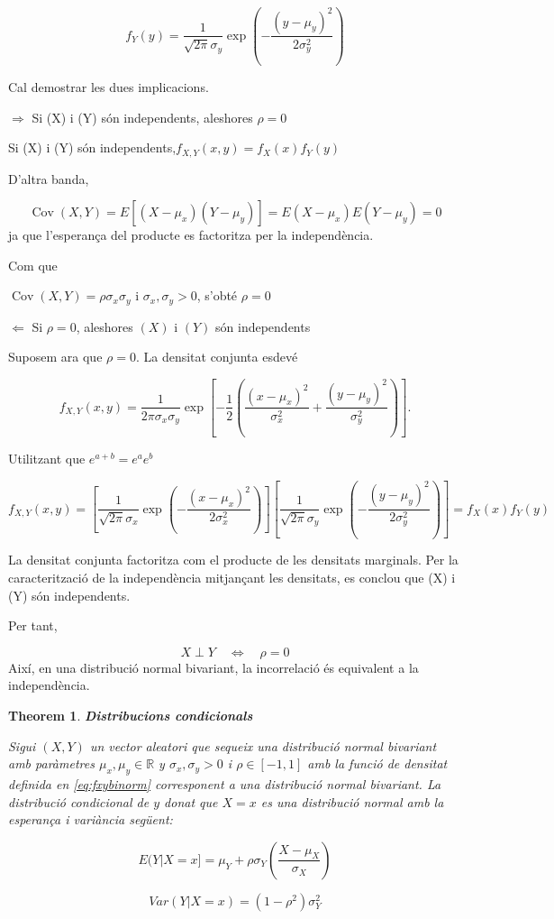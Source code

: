 \documentclass[
  catalan,
]{article}
\newtheorem{theorem}{Theorem}[section]
\theoremstyle{definition}
\theoremstyle{definition}
\theoremstyle{definition}
\theoremstyle{definition}
\theoremstyle{remark}
\begin{document}
\[
f_Y(y)=\frac{1}{\sqrt{2\pi}\sigma_y}\exp\left(-\frac{(y-\mu_y)^2}{2\sigma_y^2}\right)
\]

Cal demostrar les dues implicacions.

\(\Rightarrow\) Si (X) i (Y) són independents, aleshores \(\rho=0\)

Si (X) i (Y) són independents,\(f_{X,Y}(x,y)=f_X(x)f_Y(y)\)

D'altra banda,

\[
\operatorname{Cov}(X,Y)=E[(X-\mu_x)(Y-\mu_y)]=E(X-\mu_x)E(Y-\mu_y)=0
\]
ja que l'esperança del producte es factoritza per la independència.

Com que

\(\operatorname{Cov}(X,Y)=\rho\sigma_x\sigma_y\) i \(\sigma_x,\sigma_y>0\), s'obté \(\rho=0\)

\(\Leftarrow\) Si \(\rho=0\), aleshores \((X)\) i \((Y)\) són independents

Suposem ara que \(\rho=0\). La densitat conjunta esdevé

\[
f_{X,Y}(x,y)=\frac{1}{2\pi\sigma_x\sigma_y}\exp\left[-\frac12\left(\frac{(x-\mu_x)^2}{\sigma_x^2}+\frac{(y-\mu_y)^2}{\sigma_y^2}\right)\right].
\]

Utilitzant que \(e^{a+b}=e^ae^b\)

\[
f_{X,Y}(x,y)=\left[\frac{1}{\sqrt{2\pi}\sigma_x}\exp\left(-\frac{(x-\mu_x)^2}{2\sigma_x^2}\right)\right]\left[\frac{1}{\sqrt{2\pi}\sigma_y}\exp\left(
-\frac{(y-\mu_y)^2}{2\sigma_y^2}\right)\right] =f_X(x)f_Y(y)
\]

La densitat conjunta factoritza com el producte de les densitats marginals. Per la caracterització de la independència mitjançant les densitats, es conclou que (X) i (Y) són independents.

Per tant,

\[
X\perp Y\quad\Longleftrightarrow\quad\rho=0
\]
Així, en una distribució normal bivariant, la incorrelació és equivalent a la independència.

\begin{theorem}
\textbf{Distribucions condicionals}

Sigui \((X,Y)\) un vector aleatori que sequeix una distribució normal bivariant amb paràmetres \(\mu_x,\mu_y\in\mathbb{R}\) y \(\sigma_x,\sigma_y>0\) i \(\rho \in [-1,1]\) amb la funció de densitat definida en \eqref{eq:fxybinorm} corresponent a una distribució normal bivariant. La distribució condicional de \(y\) donat que \(X=x\) es una distribució normal amb la esperança i variància següent:

\[
E(Y|X=x]= \mu_Y+\rho \sigma_Y \left (  \dfrac {X-\mu_X}{\sigma_X}\right )   \label{eq:espcondbinorm}
\]

\[
Var(Y|X=x)=(1-\rho^2) \sigma_Y^2    \label{eq:varcondbinorm}
\]
\end{theorem}
\end{document}
